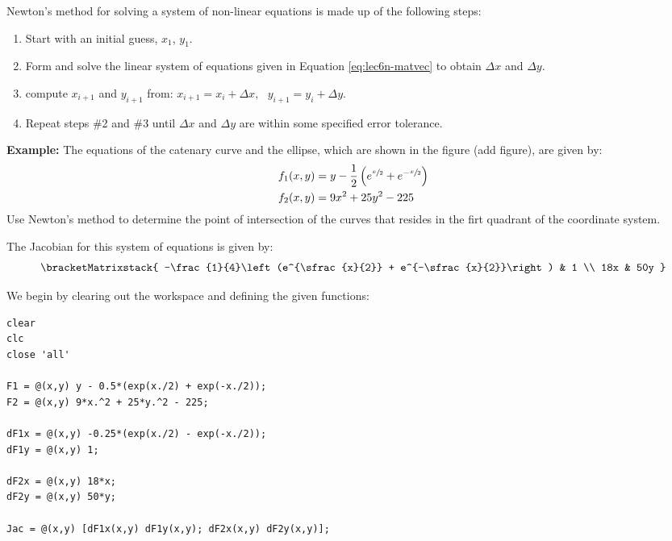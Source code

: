 \vspace{4.0cm}

 Newton's method for solving a system of non-linear equations is made up of the following steps:
\begin{enumerate}
\item Start with an initial guess, $x_1$, $y_1$.
\item Form and solve the linear system of equations given in Equation \ref{eq:lec6n-matvec} to obtain $\Delta x$ and $\Delta y$.
\item compute $x_{i+1}$ and $y_{i+1}$ from: $x_{i+1} = x_{i} + \Delta x, \ \ \ y_{i+1} = y_{i} + \Delta y$.
\item Repeat steps \#2 and \#3 until $\Delta x$ and $\Delta y$ are within some specified error tolerance.
\end{enumerate}

\vspace{0.25cm}

\noindent\textbf{Example:} The equations of the catenary curve and the ellipse, which are shown in the figure (add figure), are given by:
\begin{align*}
f_1(x,y) &= y-\frac{1}{2}\left(e^{\sfrac{x}{2}} + e^{-\sfrac{x}{2}}\right) \\
f_2(x,y) &= 9x^2 + 25y^2 - 225
\end{align*}
Use Newton's method to determine the point of intersection of the curves that resides in the firt quadrant of the coordinate system.

\vspace{0.15cm}

\noindent The Jacobian for this system of equations is given by:
\begin{equation*}
\bracketMatrixstack{
-\frac{1}{4}\left(e^{\sfrac{x}{2}} + e^{-\sfrac{x}{2}}\right) & 1 \\
18x & 50y 
}
\end{equation*}

\vspace{0.15cm}

\noindent We begin by clearing out the workspace and defining the given functions:
\begin{lstlisting}[style=myMatlab, name=lec6n-ex1]
clear
clc
close 'all'

F1 = @(x,y) y - 0.5*(exp(x./2) + exp(-x./2));
F2 = @(x,y) 9*x.^2 + 25*y.^2 - 225;

dF1x = @(x,y) -0.25*(exp(x./2) - exp(-x./2));
dF1y = @(x,y) 1;

dF2x = @(x,y) 18*x;
dF2y = @(x,y) 50*y;

Jac = @(x,y) [dF1x(x,y) dF1y(x,y); dF2x(x,y) dF2y(x,y)];
\end{lstlisting}

